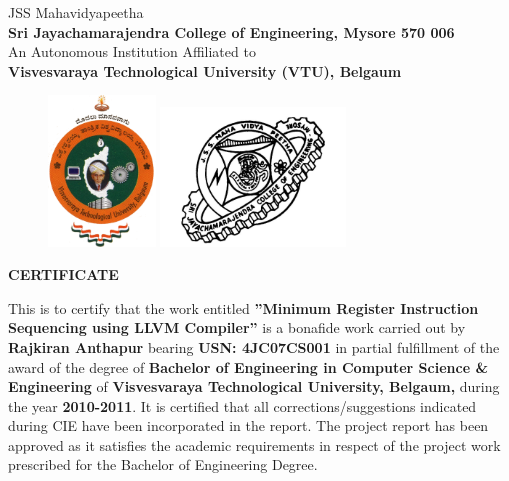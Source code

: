 \documentclass[12pt]{report}
\begin{document}
\begin{center}\large JSS Mahavidyapeetha\\\textbf{Sri Jayachamarajendra College of Engineering, Mysore 570 006}\\
An Autonomous Institution Affiliated to\\
\textbf{Visvesvaraya Technological University (VTU), Belgaum}\\
\vspace{0.2cm}
\begin{figure}[h]
\centering
\includegraphics[height=4cm]{vtu.png}
\hspace{0.1\textwidth}
\includegraphics[height=3.7cm]{jcelogo.jpg}
\end{figure}
\Huge{\bf {CERTIFICATE}}\end{center}

This is to certify that the work entitled {\bf ''Minimum Register Instruction Sequencing using LLVM Compiler''} is a bonafide work carried out by {\bf Rajkiran \hspace{1cm}Anthapur} bearing {\bf USN: 4JC07CS001} in partial fulfillment of the award of the degree of {\bf Bachelor of Engineering in Computer Science \& Engineering} of {\bf Visvesvaraya Technological University, Belgaum,} during the year {\bf 2010-2011}. It is certified that all corrections/suggestions indicated during CIE have been incorporated in the report. The project report has been approved as it satisfies the academic requirements in respect of the project work prescribed for the Bachelor of Engineering Degree.
\end{document}
